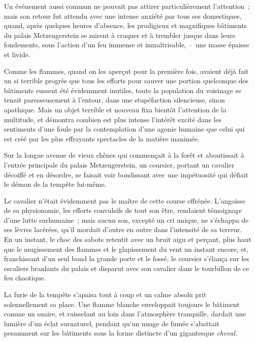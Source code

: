\documentclass[french,twoside]{book} %
\begin{document}
Un événement aussi commun ne pouvait pas attirer particulièrement l’attention ; mais son retour fut attendu avec une intense anxiété par tous ses domestiques, quand, après quelques heures d’absence, les prodigieux et magnifiques bâtiments du palais Metzengerstein se mirent à craquer et à trembler jusque dans leurs fondements, sous l’action d’un feu immense et inmaîtrisable, – une masse épaisse et livide.\par
Comme les flammes, quand on les aperçut pour la première fois, avaient déjà fait un si terrible progrès que tous les efforts pour sauver une portion quelconque des bâtiments eussent été évidemment inutiles, toute la population du voisinage se tenait paresseusement à l’entour, dans une stupéfaction silencieuse, sinon apathique. Mais un objet terrible et nouveau fixa bientôt l’attention de la multitude, et démontra combien est plus intense l’intérêt excité dans les sentiments d’une foule par la contemplation d’une agonie humaine que celui qui est créé par les plus effrayants spectacles de la matière inanimée.\par
Sur la longue avenue de vieux chênes qui commençait à la forêt et aboutissait à l’entrée principale du palais Metzengerstein, un coursier, portant un cavalier décoiffé et en désordre, se faisait voir bondissant avec une impétuosité qui défiait le démon de la tempête lui-même.\par
Le cavalier n’était évidemment pas le maître de cette course effrénée. L’angoisse de sa physionomie, les efforts convulsifs de tout son être, rendaient témoignage d’une lutte surhumaine ; mais aucun son, excepté un cri unique, ne s’échappa de ses lèvres lacérées, qu’il mordait d’outre en outre dans l’intensité de sa terreur. En un instant, le choc des sabots retentit avec un bruit aigu et perçant, plus haut que le mugissement des flammes et le glapissement du vent un instant encore, et, franchissant d’un seul bond la grande porte et le fossé, le coursier s’élança sur les escaliers branlants du palais et disparut avec son cavalier dans le tourbillon de ce feu chaotique.\par
La furie de la tempête s’apaisa tout à coup et un calme absolu prit solennellement sa place. Une flamme blanche enveloppait toujours le bâtiment comme un suaire, et ruisselant au loin dans l’atmosphère tranquille, dardait une lumière d’un éclat surnaturel, pendant qu’un nuage de fumée s’abattait pesamment sur les bâtiments sous la forme distincte d’un gigantesque\emph{ cheval}.
 
\end{document}
